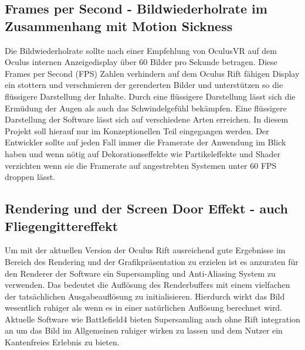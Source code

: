 \documentclass[pagesize, paper=a4, fontsize=12pt,titlepage=true, headings=small, headnosepline, abstractoff, liststotoc, nochapterprefix, plainheadsepline]{scrreprt}
\begin{document}
\subsection{Frames per Second - Bildwiederholrate im Zusammenhang mit Motion Sickness}
Die Bildwiederholrate sollte nach einer Empfehlung von OculusVR auf dem Oculus internen Anzeigedisplay über 60 Bilder pro Sekunde betragen. Diese Frames per Second (FPS) Zahlen verhindern auf dem Oculus Rift fähigen Display ein stottern und verschmieren der gerenderten Bilder und unterstützen so die flüssigere Darstellung der Inhalte. Durch eine flüssigere Darstellung lässt sich die Ermüdung der Augen als auch das Schwindelgefühl bekämpfen. Eine flüssigere Darstellung der Software lässt sich auf verschiedene Arten erreichen. In diesem Projekt soll hierauf nur im Konzeptionellen Teil eingegangen werden. Der Entwickler sollte auf jeden Fall immer die Framerate der Anwendung im Blick haben und wenn nötig auf Dekorationseffekte wie Partikeleffekte und Shader verzichten wenn sie die Framerate auf angestrebten Systemen unter 60 FPS droppen lässt.

\subsection{Rendering und der Screen Door Effekt - auch Fliegengittereffekt}
Um mit der aktuellen Version der Oculus Rift ausreichend gute Ergebnisse im Bereich des Rendering und der Grafikpräsentation zu erzielen ist es anzuraten für den Renderer der Software ein Supersampling und Anti-Aliasing System zu verwenden. Das bedeutet die Auflösung des Renderbuffers mit einem vielfachen der tatsächlichen Ausgabeauflösung zu initialisieren. Hierdurch wirkt das Bild wesentlich ruhiger als wenn es in einer natürlichen Auflösung berechnet wird. Aktuelle Software wie Battlefield4 bieten Supersamling auch ohne Rift integration an um das Bild im Allgemeinen ruhiger wirken zu lassen und dem Nutzer ein Kantenfreies Erlebnis zu bieten. 
\end{document}
